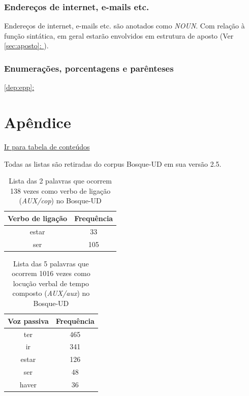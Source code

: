 \documentclass[output=paper,colorlinks,citecolor=brown]{langscibook}
\newcommand*{\fullref}[1]{\hyperref[{#1}]{\autoref*{#1}: \nameref*{#1}}} %
\begin{document}
		\subsection{Endereços de internet, e-mails etc.}
		
			Endereços de internet, e-mails etc. são anotados como \emph{NOUN}. Com relação à função sintática, em geral estarão envolvidos em estrutura de aposto (Ver \fullref{sec:aposto}).

		\subsection{Enumerações, porcentagens e parênteses}

			\fullref{dep:epp}

	

\chapter{Apêndice}

	\hyperlink{toc}{Ir para tabela de conteúdos\\}

	Todas as listas são retiradas do corpus Bosque-UD em sua versão 2.5.
	
	\begin{table}[]
		\centering
		\begin{tabular}{|c|c|}
			\hline
			\textbf{Verbo de ligação} & \textbf{Frequência} \\\hline
			estar & 33\\\hline
			ser & 105\\\hline
		\end{tabular}
		\caption{Lista das 2 palavras que ocorrem 138 vezes como verbo de ligação (\emph{AUX/cop}) no Bosque-UD}
		\label{tab:verbosdeligacao}
	\end{table}

	\begin{table}[]
		\centering
		\begin{tabular}{|c|c|}
			\hline
			\textbf{Voz passiva} & \textbf{Frequência} \\\hline
			ter & 465\\\hline
			ir & 341\\\hline
			estar & 126\\\hline
			ser & 48\\\hline
			haver & 36\\\hline
		\end{tabular}
		\caption{Lista das 5 palavras que ocorrem 1016 vezes como locução verbal de tempo composto (\emph{AUX/aux}) no Bosque-UD}
		\label{tab:loctempocomposto}
	\end{table}
\end{document}
